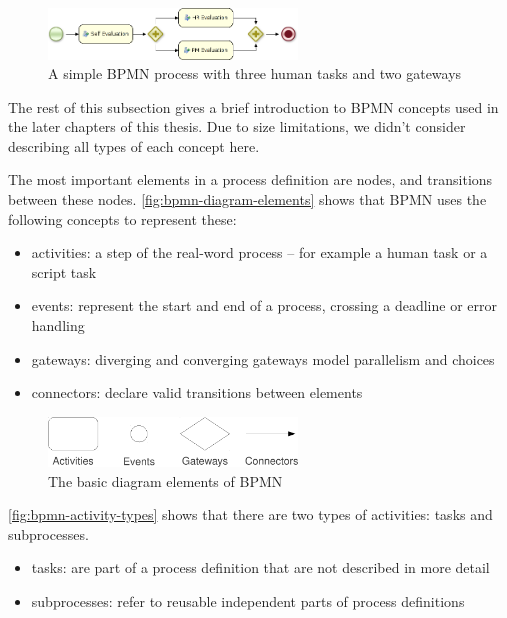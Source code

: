 \begin{figure}[H]
\centering
\includegraphics[width=250px,keepaspectratio]{bpmn-sample.png}
\caption{A simple BPMN process with three human tasks and two gateways}
\label{fig:bpmn-sample}
\end{figure}

The rest of this subsection gives a brief introduction to BPMN concepts used in
the later chapters of this thesis. Due to size limitations, we didn't consider
describing all types of each concept here.


The most important elements in a process definition are nodes, and transitions
between these nodes. \autoref{fig:bpmn-diagram-elements} shows that BPMN
uses the following concepts to represent these:

\begin{itemize}
\item activities: a step of the real-word process -- for example a human task or a script task
\item events: represent the start and end of a process, crossing a deadline or error handling
\item gateways: diverging and converging gateways model parallelism and choices
\item connectors: declare valid transitions between elements
\end{itemize}

\begin{figure}[H]
\centering
\includegraphics[width=250px,keepaspectratio]{bpmn-diagram-elements.pdf}
\caption{The basic diagram elements of BPMN}
\label{fig:bpmn-diagram-elements}
\end{figure}

\autoref{fig:bpmn-activity-types} shows that there are two types of activities: tasks and subprocesses.

\begin{itemize}
\item tasks: are part of a process definition that are not described in more detail
\item subprocesses: refer to reusable independent parts of process definitions
\end{itemize}

